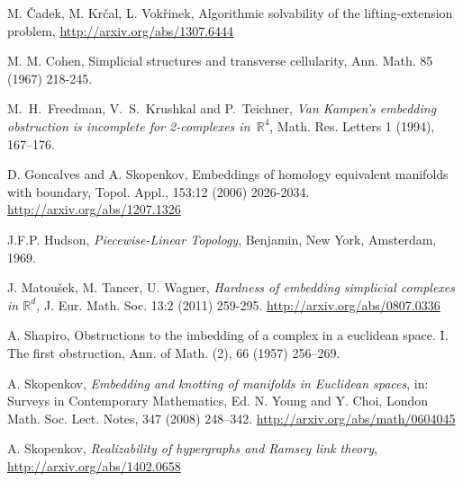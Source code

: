 \documentclass[runningheads]{llncs}
\theoremstyle{remark}
\theoremstyle{definition}
\newcommand{\R}{\mathbb{R}}
\begin{document}
{\begin{thebibliography}{99}
 M. \v Cadek, M. Kr\v cal, L. Vok\v rinek, Algorithmic solvability of the
  lifting-extension problem, \url{http://arxiv.org/abs/1307.6444}


M. M. Cohen, Simplicial structures and transverse cellularity, Ann. Math. 85 (1967) 218-245.

 M.~H.~Freedman, V.~S.~Krushkal and P.~Teichner,
  \newblock \emph{Van Kampen's embedding obstruction is incomplete for 2-complexes in~$\R^4$},
  \newblock Math. Res. Letters 1 (1994), 167--176.

 D. Goncalves and A. Skopenkov, Embeddings of homology equivalent manifolds
with boundary, Topol. Appl., 153:12 (2006) 2026-2034.
\linebreak
\url{http://arxiv.org/abs/1207.1326}

 J.F.P. Hudson, \newblock \emph{Piecewise-Linear Topology}, Benjamin, New York, Amsterdam, 1969.

 J. Matou\v sek, M. Tancer, U. Wagner,
  {\it Hardness of embedding simplicial complexes in $\R^d$,} J. Eur. Math.
  Soc. 13:2 (2011) 259-295.
\linebreak
  \url{http://arxiv.org/abs/0807.0336}


 A. Shapiro, Obstructions to the imbedding of a complex in a euclidean
              space. {I}. {T}he first obstruction, Ann. of Math. (2), 66 (1957) 256--269.


 A. Skopenkov,
  \newblock \emph{Embedding and knotting of manifolds in Euclidean spaces}, in:
  Surveys in Contemporary Mathematics, Ed. N. Young and Y. Choi,
  London Math. Soc. Lect. Notes, 347 (2008) 248--342.
\linebreak
  \url{http://arxiv.org/abs/math/0604045}

  A. Skopenkov,
  \newblock \emph{Realizability of hypergraphs and Ramsey link theory},
  \linebreak
\newblock \url{http://arxiv.org/abs/1402.0658}


\end{thebibliography}}
\end{document}
